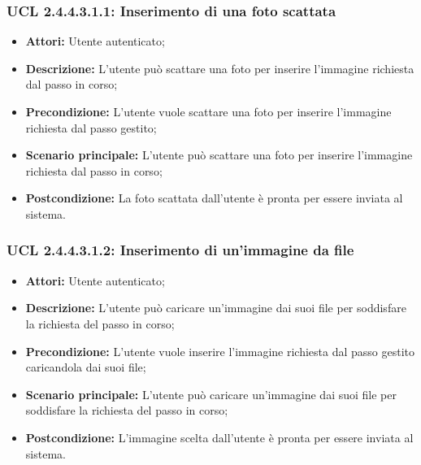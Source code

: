 \hypertarget{L2.4.4.3.1.1}{}
\subsubsection{UCL 2.4.4.3.1.1: Inserimento di una foto scattata}
\begin{itemize}
\item \textbf{Attori:} Utente autenticato;
\item \textbf{Descrizione:} L'utente può scattare una foto per inserire l'immagine richiesta dal passo in corso;
\item \textbf{Precondizione:} L'utente vuole scattare una foto per inserire l'immagine richiesta dal passo gestito;
\item \textbf{Scenario principale:} L'utente può scattare una foto per inserire l'immagine richiesta dal passo in corso;
\item \textbf{Postcondizione:} La foto scattata dall'utente è pronta per essere inviata al sistema.
\end{itemize}

\hypertarget{L2.4.4.3.1.2}{}
\subsubsection{UCL 2.4.4.3.1.2: Inserimento di un'immagine da file}
\begin{itemize}
\item \textbf{Attori:} Utente autenticato;
\item \textbf{Descrizione:} L'utente può caricare un'immagine dai suoi file per soddisfare la richiesta del passo in corso;
\item \textbf{Precondizione:} L'utente vuole inserire l'immagine richiesta dal passo gestito caricandola dai suoi file;
\item \textbf{Scenario principale:} L'utente può caricare un'immagine dai suoi file per soddisfare la richiesta del passo in corso;
\item \textbf{Postcondizione:} L'immagine scelta dall'utente è pronta per essere inviata al sistema.
\end{itemize}

